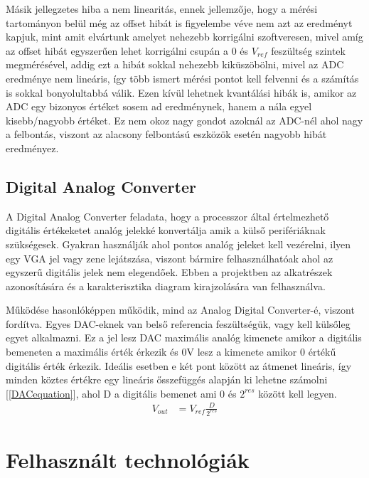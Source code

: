 Másik jellegzetes hiba a nem linearitás, ennek jellemzője, hogy a mérési 
tartományon belül még az offset hibát is figyelembe véve nem azt az eredményt 
kapjuk, mint amit elvártunk amelyet nehezebb korrigálni szoftveresen, mivel amíg 
az offset hibát egyszerűen lehet korrigálni csupán a 0 és $V_{ref}$ feszültség szintek 
megmérésével, addig ezt a hibát sokkal nehezebb kiküszöbölni, mivel az ADC 
eredménye nem lineáris, így több ismert mérési pontot kell felvenni és a számítás 
is sokkal bonyolultabbá válik. Ezen kívül lehetnek kvantálási hibák is, amikor az 
ADC egy bizonyos értéket sosem ad eredménynek, hanem a nála egyel kisebb/nagyobb 
értéket. Ez nem okoz nagy gondot azoknál az ADC-nél ahol nagy a felbontás, viszont 
az alacsony felbontású eszközök esetén nagyobb hibát eredményez.

\subsection{Digital Analog Converter}

A Digital Analog Converter feladata, hogy a processzor által értelmezhető digitális
értékeketet analóg jelekké konvertálja amik a külső perifériáknak szükségesek.
Gyakran használják ahol pontos analóg jeleket kell vezérelni, ilyen egy VGA jel
vagy zene lejátszása, viszont bármire felhasználhatóak ahol az egyszerű digitális
jelek nem elegendőek. Ebben a projektben az alkatrészek azonosítására és a 
karakterisztika diagram kirajzolására van felhasználva.

Működése hasonlóképpen működik, mind az Analog Digital Converter-é, viszont fordítva.
Egyes DAC-eknek van belső referencia feszültségük, vagy kell külsőleg egyet alkalmazni.
Ez a jel lesz DAC maximális analóg kimenete amikor a digitális bemeneten a maximális
érték érkezik és 0V lesz a kimenete amikor 0 értékű digitális érték érkezik. Ideális
esetben e két pont között az átmenet lineáris, így minden köztes értékre egy lineáris
ősszefüggés alapján ki lehetne számolni [\ref{DACequation}], ahol D a digitális bemenet
ami 0 és $2^{res}$ között kell legyen.
\begin{equation}
    \label{DACequation}
    \begin{split}
        V_{out} &= V_{ref} \frac{D}{2^{res}}
    \end{split}
    \end{equation}

\section{Felhasznált technológiák}


